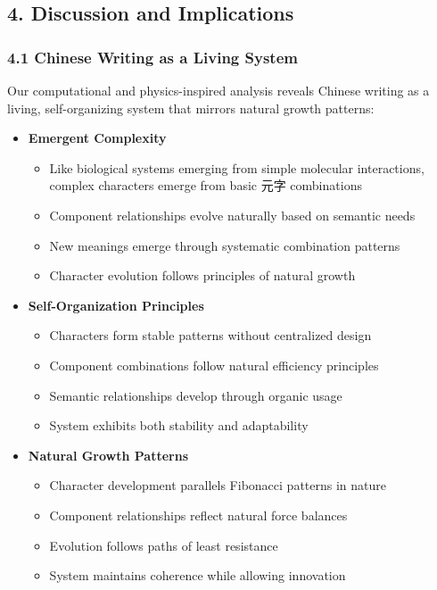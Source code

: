 \documentclass[
  11pt,
  letterpaper,
]{article}
\providecommand{\tightlist}{%
  \setlength{\itemsep}{0pt}\setlength{\parskip}{0pt}}
\begin{document}
\hypertarget{discussion-and-implications}{%
\subsection{4. Discussion and
Implications}\label{discussion-and-implications}}

\hypertarget{chinese-writing-as-a-living-system}{%
\subsubsection{4.1 Chinese Writing as a Living
System}\label{chinese-writing-as-a-living-system}}

Our computational and physics-inspired analysis reveals Chinese writing
as a living, self-organizing system that mirrors natural growth
patterns:

\begin{itemize}
\tightlist
\item
  \textbf{Emergent Complexity}

  \begin{itemize}
  \tightlist
  \item
    Like biological systems emerging from simple molecular interactions,
    complex characters emerge from basic 元字 combinations
  \item
    Component relationships evolve naturally based on semantic needs
  \item
    New meanings emerge through systematic combination patterns
  \item
    Character evolution follows principles of natural growth
  \end{itemize}
\item
  \textbf{Self-Organization Principles}

  \begin{itemize}
  \tightlist
  \item
    Characters form stable patterns without centralized design
  \item
    Component combinations follow natural efficiency principles
  \item
    Semantic relationships develop through organic usage
  \item
    System exhibits both stability and adaptability
  \end{itemize}
\item
  \textbf{Natural Growth Patterns}

  \begin{itemize}
  \tightlist
  \item
    Character development parallels Fibonacci patterns in nature
  \item
    Component relationships reflect natural force balances
  \item
    Evolution follows paths of least resistance
  \item
    System maintains coherence while allowing innovation
  \end{itemize}
\end{itemize}
\end{document}
